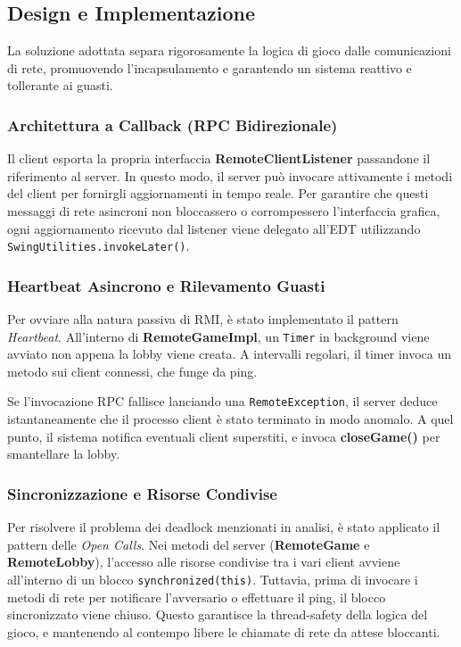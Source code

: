 \newpage
\subsection{Design e Implementazione}
La soluzione adottata separa rigorosamente la logica di gioco dalle comunicazioni di rete, promuovendo l'incapsulamento e garantendo un sistema reattivo e tollerante ai guasti.

\subsubsection{Architettura a Callback (RPC Bidirezionale)}
Il client esporta la propria interfaccia \textbf{RemoteClientListener} passandone il riferimento al server.
In questo modo, il server può invocare attivamente i metodi del client per fornirgli aggiornamenti in tempo reale.
Per garantire che questi messaggi di rete asincroni non bloccassero o corrompessero l'interfaccia grafica, ogni aggiornamento ricevuto dal listener viene delegato all'EDT utilizzando \texttt{SwingUtilities.invokeLater()}.

\subsubsection{Heartbeat Asincrono e Rilevamento Guasti}
Per ovviare alla natura passiva di RMI, è stato implementato il pattern \emph{Heartbeat}. All'interno di \textbf{RemoteGameImpl}, un \texttt{Timer} in background viene avviato non appena la lobby viene creata. A intervalli regolari, il timer invoca un metodo sui client connessi, che funge da ping. 

Se l'invocazione RPC fallisce lanciando una \texttt{RemoteException}, il server deduce istantaneamente che il processo client è stato terminato in modo anomalo. A quel punto, il sistema notifica eventuali client superstiti, e invoca \textbf{closeGame()} per smantellare la lobby.

\subsubsection{Sincronizzazione e Risorse Condivise}
Per risolvere il problema dei deadlock menzionati in analisi, è stato applicato il pattern delle \emph{Open Calls}. Nei metodi del server (\textbf{RemoteGame} e \textbf{RemoteLobby}), l'accesso alle risorse condivise tra i vari client avviene all'interno di un blocco \texttt{synchronized(this)}.
Tuttavia, prima di invocare i metodi di rete per notificare l'avversario o effettuare il ping, il blocco sincronizzato viene chiuso. Questo garantisce la thread-safety della logica del gioco, e mantenendo al contempo libere le chiamate di rete da attese bloccanti.

